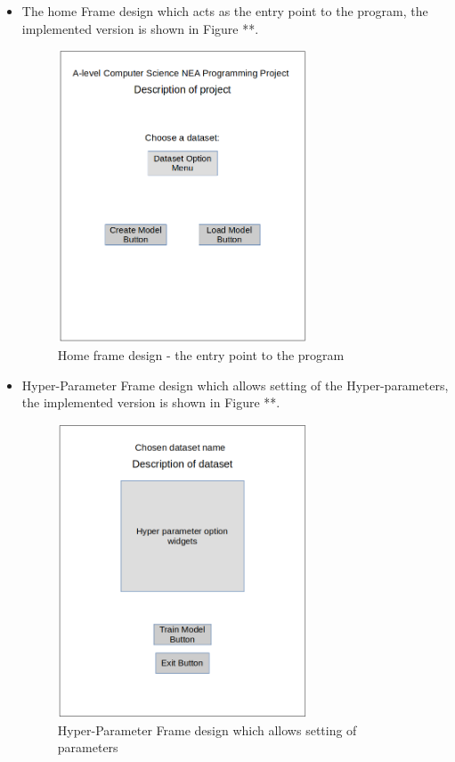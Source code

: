 \documentclass[./project-report/src/latex/project-report.tex]{subfiles}
\begin{document}
\begin{itemize}
    \item The home Frame design which acts as the entry point to the program, the implemented version is shown in Figure **.
        \begin{figure}[h!]
        \centering
        \includegraphics[width=0.7\textwidth]{./project-report/src/images/home-frame-design.png}
        \caption{Home frame design - the entry point to the program}
        \label{fig:home-frame-design}
        \end{figure}

    \pagebreak

    \item Hyper-Parameter Frame design which allows setting of the Hyper-parameters, the implemented version is shown in Figure **.
        \begin{figure}[h!]
        \centering
        \includegraphics[width=0.7\textwidth]{./project-report/src/images/hyper-parameter-frame-design.png}
        \caption{Hyper-Parameter Frame design which allows setting of parameters}
        \label{fig:hyper-parameter-frame-design}
        \end{figure}


\end{itemize}
\end{document}

